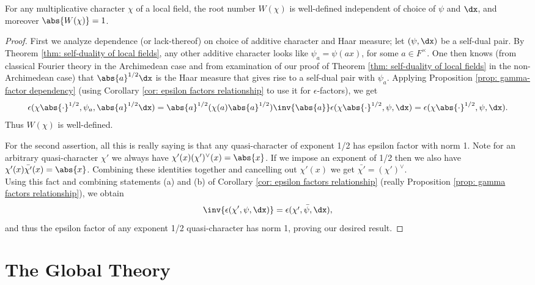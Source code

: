 \documentclass[11pt, x11names, openany]{book}
\begin{document}
\begin{corollary}
    \label{cor: root number has norm 1}
    For any multiplicative character $\chi$ of a local field, the root number $W(\chi)$ is well-defined independent of choice of $\psi$ and $\dx$, and moreover $\abs{W(\chi)} = 1$.
\end{corollary}
\begin{proof}
First we analyze dependence (or lack-thereof) on choice of additive character and Haar measure; let $(\psi, \dx)$ be a self-dual pair. By Theorem \ref{thm: self-duality of local fields}, any other additive character looks like $\psi_a = \psi(ax)$, for some $a \in F^\times$. One then knows (from classical Fourier theory in the Archimedean case and from examination of our proof of Theorem \ref{thm: self-duality of local fields} in the non-Archimedean case) that $\abs{a}^{1/2} \dx$ is the Haar measure that gives rise to a self-dual pair with $\psi_a$. Applying Proposition \ref{prop: gamma-factor dependency} (using Corollary \ref{cor: epsilon factors relationship} to use it for $\epsilon$-factors), we get
\begin{align*}
\epsilon(\chi \abs{\cdot}^{1/2}, \psi_a, \abs{a}^{1/2} \dx) = \abs{a}^{1/2} (\chi(a) \abs{a}^{1/2}) \inv{\abs{a}} \epsilon(\chi \abs{\cdot}^{1/2}, \psi, \dx) = \epsilon(\chi \abs{\cdot}^{1/2}, \psi, \dx).
\end{align*}
Thus $W(\chi)$ is well-defined.

For the second assertion, all this is really saying is that any quasi-character of exponent 1/2 has epsilon factor with norm 1. Note for an arbitrary quasi-character $\chi'$ we always have $\chi'(x) (\chi')^\lor(x) = \abs{x}$. If we impose an exponent of 1/2 then we also have $\chi'(x) \bar{\chi'}(x) = \abs{x}$. Combining these identities together and cancelling out $\chi'(x)$ we get $\bar{\chi'} = (\chi')^\lor$.\\
Using this fact and combining statements (a) and (b) of Corollary \ref{cor: epsilon factors relationship} (really Proposition \ref{prop: gamma factors relationship}), we obtain 
\begin{equation*}
    \inv{\epsilon(\chi', \psi, \dx)} = \bar{\epsilon(\chi', \psi, \dx)},
\end{equation*}
and thus the epsilon factor of any exponent 1/2 quasi-character has norm 1, proving our desired result.
\end{proof}


\newpage
\section{The Global Theory}
\label{section: The Global Theory}
\end{document}
